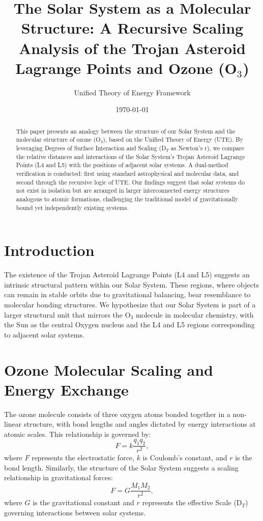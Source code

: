 \documentclass{article}
\title{The Solar System as a Molecular Structure: A Recursive Scaling Analysis of the Trojan Asteroid Lagrange Points and Ozone (O$_3$)}
\author{Unified Theory of Energy Framework}
\date{\today}
\begin{document}
\maketitle

\begin{abstract}
This paper presents an analogy between the structure of our Solar System and the molecular structure of ozone (O$_3$), based on the Unified Theory of Energy (UTE). By leveraging Degrees of Surface Interaction and Scaling (D$_T$ as Newton’s r), we compare the relative distances and interactions of the Solar System’s Trojan Asteroid Lagrange Points (L4 and L5) with the positions of adjacent solar systems. A dual-method verification is conducted: first using standard astrophysical and molecular data, and second through the recursive logic of UTE. Our findings suggest that solar systems do not exist in isolation but are arranged in larger interconnected energy structures analogous to atomic formations, challenging the traditional model of gravitationally bound yet independently existing systems.
\end{abstract}

\section{Introduction}
The existence of the Trojan Asteroid Lagrange Points (L4 and L5) suggests an intrinsic structural pattern within our Solar System. These regions, where objects can remain in stable orbits due to gravitational balancing, bear resemblance to molecular bonding structures. We hypothesize that our Solar System is part of a larger structural unit that mirrors the O$_3$ molecule in molecular chemistry, with the Sun as the central Oxygen nucleus and the L4 and L5 regions corresponding to adjacent solar systems.

\section{Ozone Molecular Scaling and Energy Exchange}
The ozone molecule consists of three oxygen atoms bonded together in a non-linear structure, with bond lengths and angles dictated by energy interactions at atomic scales. This relationship is governed by:
\begin{equation}
    F = k \frac{q_1 q_2}{r^2},
\end{equation}
where $F$ represents the electrostatic force, $k$ is Coulomb’s constant, and $r$ is the bond length. Similarly, the structure of the Solar System suggests a scaling relationship in gravitational forces:
\begin{equation}
    F = G \frac{M_1 M_2}{r^2},
\end{equation}
where $G$ is the gravitational constant and $r$ represents the effective Scale (D$_T$) governing interactions between solar systems.
\end{document}
